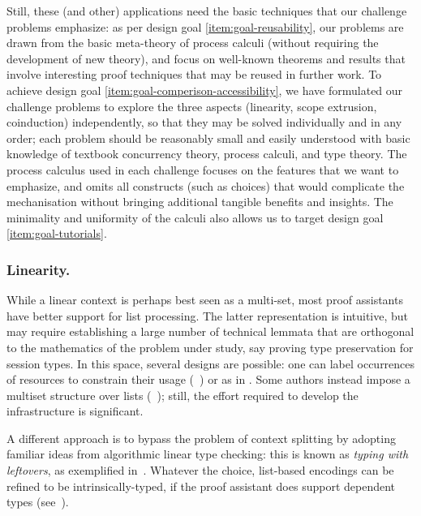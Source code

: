 \documentclass[runningheads]{llncs}
\begin{document}

Still, these (and other) applications need the basic
techniques that our challenge problems emphasize: as per design goal
\ref{item:goal-reusability}, our problems are drawn from the basic
meta-theory of process calculi (without requiring the development of
new theory), and focus on well-known theorems and results that involve
interesting proof techniques that may be reused in further work.  To
achieve design goal \ref{item:goal-comperison-accessibility}, we have
formulated our challenge problems to explore the three aspects
(linearity, scope extrusion, coinduction) independently, so that they
may be solved individually and in any order; each problem should be
reasonably small and easily understood with basic knowledge of
textbook concurrency theory, process calculi, and type theory.  The
process calculus used in each challenge focuses on the features that
we want to emphasize, and omits all constructs (such as choices) that
would complicate the mechanisation without bringing additional
tangible benefits and insights.  The minimality and uniformity of the
calculi also allows us to target design goal
\ref{item:goal-tutorials}.

\subsubsection{Linearity.}
While a linear context is perhaps best seen as a multi-set, most proof assistants have better support for list processing.
The latter representation is intuitive, but may require establishing a large number of technical lemmata that are orthogonal to the mathematics of the problem under study, say proving type preservation for session types.
In this space, several designs are possible: one can label occurrences of resources to constrain their usage (\eg~\cite{CicconeP20}) or  as in \cite{Castro2020}.
Some authors instead impose a multiset structure over lists (\eg~\cite{ChaudhuriLR19,Danielsson12}); still, the effort required to develop the infrastructure is significant.

A different approach is to bypass the problem of context splitting by adopting familiar ideas from algorithmic linear type checking: this is known as \emph{typing with leftovers}, as exemplified in~\cite{DBLP:conf/forte/ZalakainD21}.
Whatever the choice, list-based encodings can be refined to be intrinsically-typed, if the proof assistant does support dependent types (see~\cite{Thiemann2019,CicconeP20,RouvoetPKV20}).
\end{document}
